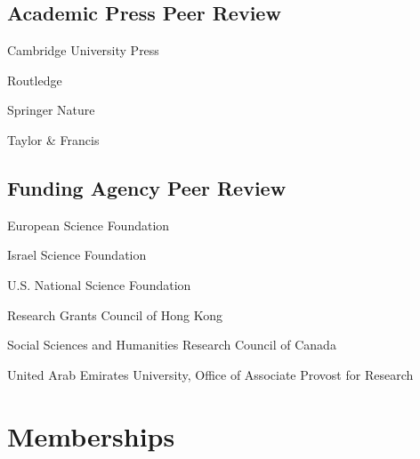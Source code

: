 \documentclass[11pt,letterpaper]{report} %
\newcommand{\listitemspace}{0.25em}
\renewenvironment{itemize}
{\begin{list}{}{\setlength{\leftmargin}{0em}
                \setlength{\parskip}{0em}
                \setlength{\itemsep}{\listitemspace}
                \setlength{\parsep}{\listitemspace}}}
{\end{list}}
\begin{document}
\begin{itemize}
    \end{itemize}

    \subsection*{Academic Press Peer Review}

    \begin{itemize}

        \item Cambridge University Press
        \item Routledge
        \item Springer Nature
        \item Taylor \& Francis

    \end{itemize}

    \subsection*{Funding Agency Peer Review}

    \begin{itemize}

        \item European Science Foundation
        \item Israel Science Foundation
        \item U.S. National Science Foundation
        \item Research Grants Council of Hong Kong
        \item Social Sciences and Humanities Research Council of Canada
        \item United Arab Emirates University, Office of Associate Provost for Research

    \end{itemize}



    \section*{Memberships}
\end{document}

